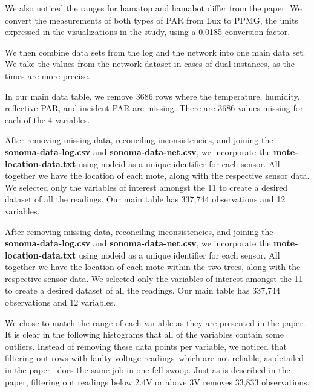 \documentclass[]{article}
\begin{document}
We also noticed the ranges for hamatop and hamabot differ from the
paper. We convert the measurements of both types of PAR from Lux to
PPMG, the units expressed in the visualizations in the study, using a
0.0185 conversion factor.

We then combine data sets from the log and the network into one main
data set. We take the values from the network dataset in cases of dual
instances, as the times are more precise.

In our main data table, we remove 3686 rows where the temperature,
humidity, reflective PAR, and incident PAR are missing. There are 3686
values missing for each of the 4 variables.

After removing missing data, reconciling inconsistencies, and joining
the \textbf{sonoma-data-log.csv} and \textbf{sonoma-data-net.csv}, we
incorporate the \textbf{mote-location-data.txt} using nodeid as a unique
identifier for each sensor. All together we have the location of each
mote, along with the respective sensor data. We selected only the
variables of interest amongst the 11 to create a desired dataset of all
the readings. Our main table has 337,744 observations and 12 variables.

After removing missing data, reconciling inconsistencies, and joining
the \textbf{sonoma-data-log.csv} and \textbf{sonoma-data-net.csv}, we
incorporate the \textbf{mote-location-data.txt} using nodeid as a unique
identifier for each sensor. All together we have the location of each
mote within the two trees, along with the respective sensor data. We
selected only the variables of interest amongst the 11 to create a
desired dataset of all the readings. Our main table has 337,744
observations and 12 variables.

We chose to match the range of each variable as they are presented in
the paper. It is clear in the following histograms that all of the
variables contain some outliers. Instead of removing these data points
per variable, we noticed that filtering out rows with faulty voltage
readings--which are not reliable, as detailed in the paper-- does the
same job in one fell swoop. Just as is described in the paper, filtering
out readings below 2.4V or above 3V removes 33,833 observations.
\end{document}
